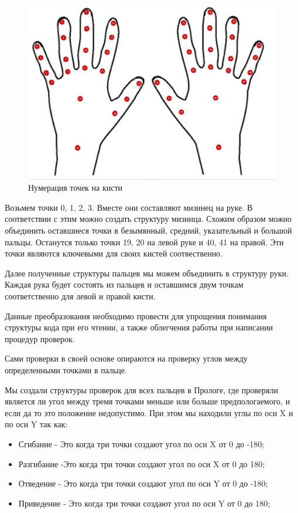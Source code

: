 \begin{figure}[ht!]
	\centering
	\includegraphics[scale=0.5]{Kist.jpg}
	\caption{Нумерация точек на кисти}
	\label{fig:hands}
\end{figure}

\hspace{0.6cm} Возьмем точки 0, 1, 2, 3. Вместе они составляют мизинец на руке. В соответствии с этим можно создать структуру мизинца. Схожим образом можно объединить оставшиеся точки в безымянный, средний, указательный и большой пальцы. Останутся только точки 19, 20 на левой руке и 40, 41 на правой. Эти точки являются ключевыми для своих кистей соотвественно.

\hspace{0.6cm} Далее полученные структуры пальцев мы можем объединить в структуру руки. Каждая рука будет состоять из пальцев и оставшимся двум точкам соответственно для левой и правой кисти.

\hspace{0.6cm} Данные преобразования необходимо провести для упрощения понимания структуры кода при его чтении, а также облегчения работы при написании процедур проверок.

\hspace{0.6cm} Сами проверки в своей основе опираются на проверку углов между определенными точками в пальце.  

\hspace{0.6cm} Мы создали структуры проверок для всех пальцев в Прологе, где проверяли является ли угол между тремя точками меньше или больше предпологаемого, и если да то это положение недопустимо. При этом мы находили углы по оси X и по оси Y так как:
\begin{itemize}
	\item Сгибание - Это когда три точки создают угол по оси X от 0 до -180;
	\item Разгибание -Это когда три точки создают угол по оси X от 0 до 180;
	\item Отведение - Это когда три точки создают угол по оси Y от 0 до -180;
	\item Приведение - Это когда три точки создают угол по оси Y от 0 до 180;
\end{itemize}

